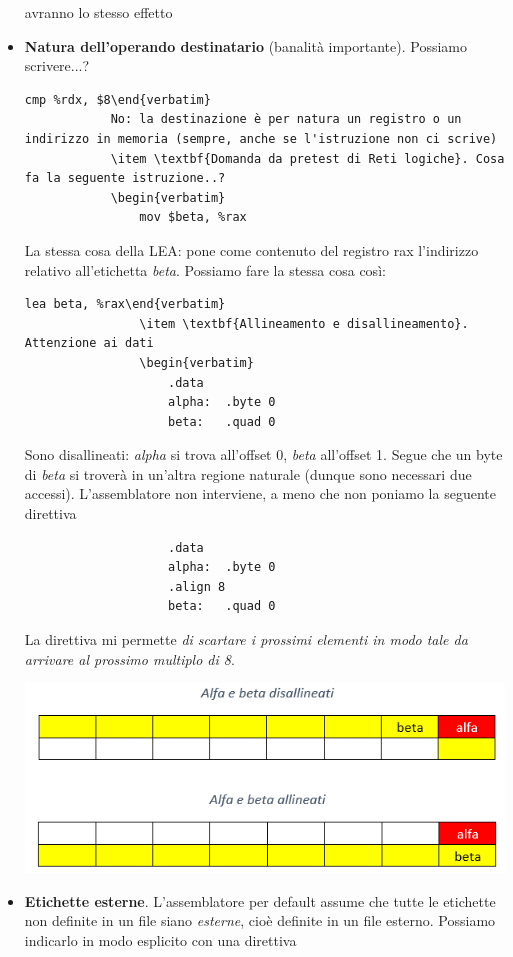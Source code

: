 \begin{itemize}
\begin{framed}
			avranno lo stesso effetto
		\end{framed}
		\item \textbf{Natura dell'operando destinatario} (banalità importante). Possiamo scrivere...? \begin{verbatim}cmp %rdx, $8\end{verbatim} 
			No: la destinazione è per natura un registro o un indirizzo in memoria (sempre, anche se l'istruzione non ci scrive) 
			\item \textbf{Domanda da pretest di Reti logiche}. Cosa fa la seguente istruzione..?
			\begin{verbatim}
				mov $beta, %rax
			\end{verbatim}
			La stessa cosa della LEA: pone come contenuto del registro rax l'indirizzo relativo all'etichetta \emph{beta}. Possiamo fare la stessa cosa così:
			\begin{verbatim}lea beta, %rax\end{verbatim}
				\item \textbf{Allineamento e disallineamento}. Attenzione ai dati
				\begin{verbatim}
					.data
					alpha:  .byte 0
					beta:   .quad 0
				\end{verbatim}
				Sono disallineati: \emph{alpha} si trova all'offset 0, \emph{beta} all'offset 1. Segue che un byte di \emph{beta} si troverà in un'altra regione naturale (dunque sono necessari due accessi). L'assemblatore non interviene, a meno che non poniamo la seguente direttiva
				\begin{verbatim}
					.data
					alpha:  .byte 0
					.align 8
					beta:   .quad 0
				\end{verbatim}
				La direttiva mi permette \emph{di scartare i prossimi elementi in modo tale da arrivare al prossimo multiplo di 8}.
				\begin{center}
					\includegraphics[scale=.85]{img/149.PNG}
				\end{center} 
				\item \textbf{Etichette esterne}. L'assemblatore per default assume che tutte le etichette non definite in un file siano \emph{esterne}, cioè definite in un file esterno. Possiamo indicarlo in modo esplicito con una direttiva

\end{itemize}
